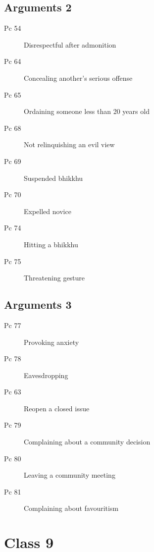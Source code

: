 \documentclass[11pt,oneside]{memoir}
\begin{document}
\begin{multicols}{2}

\section{Arguments 2}

\begin{description}
\item[Pc 54] Disrespectful after admonition
\item[Pc 64] Concealing another's serious offense
\item[Pc 65 \orig] Ordaining someone less than 20 years old%
\item[Pc 68] Not relinquishing an evil view
\item[Pc 69] Suspended bhikkhu
\item[Pc 70] Expelled novice
\item[Pc 74] Hitting a bhikkhu
\item[Pc 75] Threatening gesture
\end{description}

\columnbreak

\section{Arguments 3}

\begin{description}
\item[Pc 77] Provoking anxiety
\item[Pc 78 \orig] Eavesdropping%
\item[Pc 63] Reopen a closed issue
\item[Pc 79 \orig] Complaining about a community decision%
\item[Pc 80 \orig] Leaving a community meeting%
\item[Pc 81] Complaining about favouritism
\end{description}

\end{multicols}

\chapter{Class 9}
\end{document}
